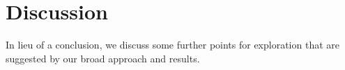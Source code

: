 \documentclass[english]{article}
\let\mc=\mathcal
\begin{document}





\pagebreak



\section{Discussion}\label{sec:discussion}

In lieu of a conclusion, we discuss some further points for exploration that are suggested by our broad approach and results. 
\end{document}
